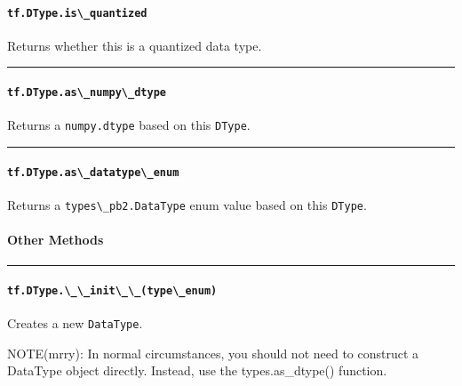 \paragraph{\texorpdfstring{\lstinline{tf.DType.is\_quantized}
}{tf.DType.is\_quantized }}\label{tf.dtype.isux5fquantized}

Returns whether this is a quantized data type.

\begin{center}\rule{0.5\linewidth}{\linethickness}\end{center}

\paragraph{\texorpdfstring{\lstinline{tf.DType.as\_numpy\_dtype}
}{tf.DType.as\_numpy\_dtype }}\label{tf.dtype.asux5fnumpyux5fdtype}

Returns a \lstinline{numpy.dtype} based on this \lstinline{DType}.

\begin{center}\rule{0.5\linewidth}{\linethickness}\end{center}

\paragraph{\texorpdfstring{\lstinline{tf.DType.as\_datatype\_enum}
}{tf.DType.as\_datatype\_enum }}\label{tf.dtype.asux5fdatatypeux5fenum}

Returns a \lstinline{types\_pb2.DataType} enum value based on this
\lstinline{DType}.

\paragraph{Other Methods }\label{other-methods-2}

\begin{center}\rule{0.5\linewidth}{\linethickness}\end{center}

\paragraph{\texorpdfstring{\lstinline{tf.DType.\_\_init\_\_(type\_enum)}
}{tf.DType.\_\_init\_\_(type\_enum) }}\label{tf.dtype.ux5fux5finitux5fux5ftypeux5fenum}

Creates a new \lstinline{DataType}.

NOTE(mrry): In normal circumstances, you should not need to construct a
DataType object directly. Instead, use the types.as\_dtype() function.


